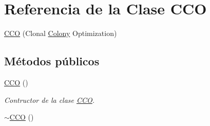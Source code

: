\hypertarget{class_c_c_o}{\section{Referencia de la Clase C\+C\+O}
\label{class_c_c_o}
}


\hyperlink{class_c_c_o}{C\+C\+O} (Clonal \hyperlink{class_colony}{Colony} Optimization)  


\subsection*{Métodos públicos}
\begin{DoxyCompactItemize}
\item 
\hypertarget{class_c_c_o_a48251cd1f851d236c4aec73c82b39682}{\hyperlink{class_c_c_o_a48251cd1f851d236c4aec73c82b39682}{C\+C\+O} ()}\label{class_c_c_o_a48251cd1f851d236c4aec73c82b39682}

\begin{DoxyCompactList}\small\item\em Contructor de la clase \hyperlink{class_c_c_o}{C\+C\+O}. \end{DoxyCompactList}\item 
\hypertarget{class_c_c_o_adaa4d2a9fefa24dfcd6eb8f367f60cf6}{\hyperlink{class_c_c_o_adaa4d2a9fefa24dfcd6eb8f367f60cf6}{$\sim$\+C\+C\+O} ()}\label{class_c_c_o_adaa4d2a9fefa24dfcd6eb8f367f60cf6}


\end{DoxyCompactItemize}
